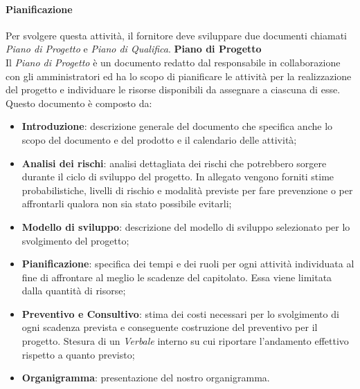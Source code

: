 \paragraph{Pianificazione}
Per svolgere questa attività, il fornitore deve sviluppare due documenti chiamati \textit{Piano di Progetto} e \textit{Piano di Qualifica}.
\textbf{Piano di Progetto}\mbox{}\\ [1mm]
Il \textit{Piano di Progetto} è un documento redatto dal responsabile in collaborazione con gli amministratori ed ha lo scopo di pianificare le attività per la realizzazione del progetto e individuare le risorse disponibili da assegnare a ciascuna di esse.
Questo documento è composto da:
\begin{itemize}
	\item \textbf{Introduzione}: descrizione generale del documento che specifica anche lo scopo del documento e del prodotto e il calendario delle attività;
	\item \textbf{Analisi dei rischi}: analisi dettagliata dei rischi che potrebbero sorgere durante il ciclo di sviluppo del progetto. In allegato vengono forniti stime probabilistiche, livelli di rischio e modalità previste per fare prevenzione o per affrontarli qualora non sia stato possibile evitarli;
	\item \textbf{Modello di sviluppo}\glo: descrizione del modello di sviluppo selezionato per lo svolgimento del progetto;
	\item \textbf{Pianificazione}: specifica dei tempi e dei ruoli per ogni attività individuata al fine di affrontare al meglio le scadenze del capitolato\glo. Essa viene limitata dalla quantità di risorse;
	\item \textbf{Preventivo e Consultivo}: stima dei costi necessari per lo svolgimento di ogni scadenza prevista e conseguente costruzione del preventivo per il progetto. Stesura di un \textit{Verbale} interno su cui riportare l'andamento effettivo rispetto a quanto previsto;
	\item \textbf{Organigramma}: presentazione del nostro organigramma.
\end{itemize}
